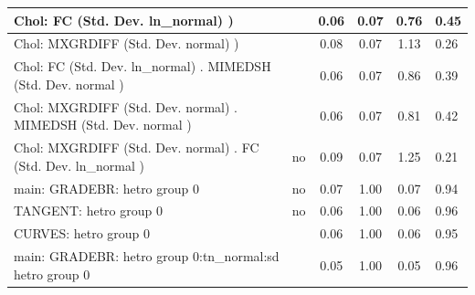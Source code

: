 \begin{table}
\begin{center}
\begin{tabular}{|l|l|c|c|c|l|}
			\hline
			 Chol: FC (Std. Dev. ln_normal) ) &  & 0.06 & 0.07 & 0.76 & 0.45 \\
			\hline
			 Chol: MXGRDIFF (Std. Dev. normal) ) &  & 0.08 & 0.07 & 1.13 & 0.26 \\
			\hline
			 Chol: FC (Std. Dev. ln_normal) . MIMEDSH (Std. Dev.   normal ) &  & 0.06 & 0.07 & 0.86 & 0.39 \\
			\hline
			 Chol: MXGRDIFF (Std. Dev. normal) . MIMEDSH (Std. Dev.   normal ) &  & 0.06 & 0.07 & 0.81 & 0.42 \\
			\hline
			 Chol: MXGRDIFF (Std. Dev. normal) . FC (Std. Dev.   ln_normal ) & no & 0.09 & 0.07 & 1.25 & 0.21 \\
			\hline
			main: GRADEBR: hetro group 0 & no & 0.07 & 1.00 & 0.07 & 0.94 \\
			\hline
			TANGENT: hetro group 0 & no & 0.06 & 1.00 & 0.06 & 0.96 \\
			\hline
			CURVES: hetro group 0 &  & 0.06 & 1.00 & 0.06 & 0.95 \\
			\hline
			main: GRADEBR: hetro group 0:tn_normal:sd  hetro group 0 &  & 0.05 & 1.00 & 0.05 & 0.96 \\
			\hline
		\end{tabular}
	\end{center}
\end{table}